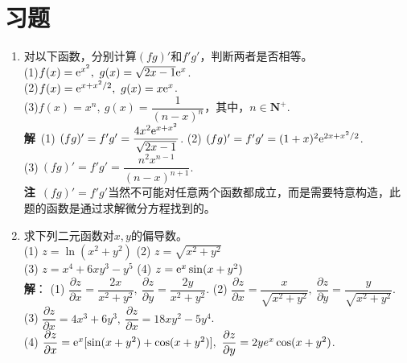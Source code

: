 \section{习题} 
\begin{enumerate}[label={\textbf{\arabic*.}},leftmargin=
    \inteval{\myenumleftmargin}pt]
\item 对以下函数，分别计算$ (fg)' $和$ f'g' $，判断两者是否相等。\\
(1)$ f(x)=\e^{x^2},\ g(x)=\sqrt{2x-1}\e^x $.\\
(2)$ f(x)=\e^{x+x^2/2},\ g(x)=x\e^x $. \\
(3)$ f(x)=x^n,\ g(x)=\dfrac{1}{(n-x)^n} $，其中，$ n\in \textbf{N}^+ $.
\ifteach \\
\textbf{解}\ (1)$\ (fg)'=f'g'=\dfrac{4x^2\e^{x+x^2}}{\sqrt{2x-1}} $. \quad
(2)$\ (fg)'=f'g'=(1+x)^2\mathrm{e}^{2x+x^2/2} $. \\
(3)$\ (fg)'=f'g'=\dfrac{n^2x^{n-1}}{(n-x)^{n+1}} $. \\
\textbf{注}\ $ (fg)'=f'g' $当然不可能对任意两个函数都成立，而是需要特意构造，此题的函数是通过求解微分方程找到的。
\fi

\item 求下列二元函数对$ x,y $的偏导数。\\
(1) $ z=\ln(x^2+y^2) $ \quad (2) $ z=\sqrt{x^2+y^2} $ \\
(3) $ z=x^4+6xy^3-y^5 $ \quad (4) $ z=\mathrm{e}^x\sin(x+y^2)  $ 
\ifteach \\ \textbf{解}：
 (1) $ \dfrac{\partial z}{\partial x}=\dfrac{2x}{x^2+y^2},\ 
\dfrac{\partial z}{\partial y}=\dfrac{2y}{x^2+y^2} $. \quad
(2) $ \dfrac{\partial z}{\partial x}=\dfrac{x}{\sqrt{x^2+y^2}},\ 
\dfrac{\partial z}{\partial y}=\dfrac{y}{\sqrt{x^2+y^2}} $. \\
(3) $ \dfrac{\partial z}{\partial x}=4x^3+6y^3,\ 
\dfrac{\partial z}{\partial x}=18xy^2-5y^4 $. \\
(4) $ \dfrac{\partial z}{\partial x}=\e^x[\sin(x+y^2)+\cos(x+y^2)],\ 
\dfrac{\partial z}{\partial y}=2ye^x \cos(x+y^2) $. 
\fi


\end{enumerate}
